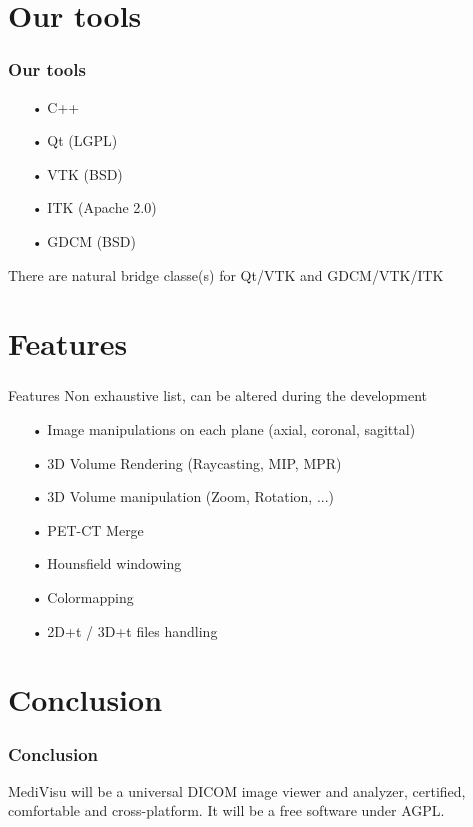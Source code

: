 \documentclass[11pt]{beamer}
\begin{document}
\section{Our tools}

\begin{frame}
\frametitle{Our tools}
\begin{itemize}
\item[•] C++
\item[•] Qt (LGPL)
\item[•] VTK (BSD)
\item[•] ITK (Apache 2.0)
\item[•] GDCM (BSD)
\end{itemize}
There are natural bridge classe(s) for Qt/VTK and GDCM/VTK/ITK
\end{frame}

\section{Features}

\begin{frame}
\frametitle{}Features
Non exhaustive list, can be altered during the development 
\begin{itemize}
\item[•] Image manipulations on each plane (axial, coronal, sagittal)
\item[•] 3D Volume Rendering (Raycasting, MIP, MPR)
\item[•] 3D Volume manipulation (Zoom, Rotation, ...)
\item[•] PET-CT Merge
\item[•] Hounsfield windowing
\item[•] Colormapping
\item[•] 2D+t / 3D+t files handling
\end{itemize}
\end{frame}

\section{Conclusion}

\begin{frame}
\frametitle{Conclusion}
MediVisu will be a universal DICOM image viewer and analyzer, certified, comfortable and cross-platform.
It will be a free software under AGPL.
\end{frame}
\end{document}
